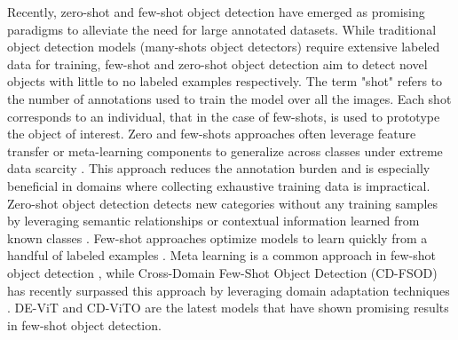 \documentclass[12pt,a4paper,oneside]{report}
\begin{document}
Recently, zero-shot and few-shot object detection have emerged as promising paradigms
to alleviate the need for large annotated datasets.
While traditional object detection models (many-shots object detectors) require extensive labeled data for training, 
few-shot and zero-shot object detection aim to detect novel objects with little to 
no labeled examples respectively. The term "shot" refers to the number of annotations 
used to train the model over all the images. Each shot corresponds to an individual, 
that in the case of few-shots, is used to prototype the object of interest.
Zero and few-shots approaches often leverage feature transfer or meta-learning components to generalize 
across classes under extreme data scarcity \cite{liMetaSGDLearningLearn2017}. This approach reduces the annotation 
burden and is especially beneficial in domains where collecting exhaustive training 
data is impractical.
Zero-shot object detection detects new categories without any training samples by 
leveraging semantic relationships or contextual information learned from known classes \cite{bansalZeroShotObjectDetection2018}. 
Few-shot approaches optimize models to learn quickly from a handful of labeled examples \cite{huangSurveySelfSupervisedFewShot2022}.
Meta learning is a common approach in few-shot object detection 
\cite{MetaLearningBasedIncrementalFewShot,wuMetaRCNNMetaLearning2020,fuMetaSSDFastAdaptation2019,zhangMetaDETRFewShotObject2021}, 
while Cross-Domain Few-Shot Object Detection (CD-FSOD) has recently surpassed this
approach by leveraging domain adaptation techniques \cite{saBroaderStudyCrossdomain2023}.
DE-ViT \cite{xuDeViTDecomposingVision2023}  and CD-ViTO \cite{fuCrossDomainFewShotObject2024}  
are the latest models that have shown promising results in few-shot object detection.
\end{document}

